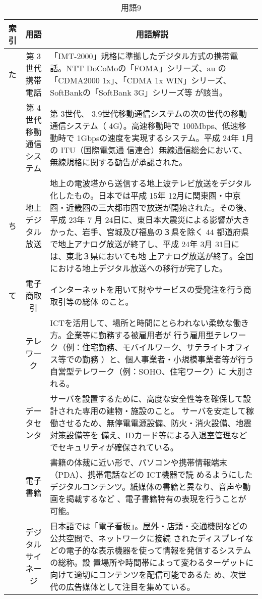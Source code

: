\begin{table}[htb]
  \begin{center}
    \caption{用語9}
    \begin{tabular}{|c|c|p{10cm}|}
      \hline
      索引 & 用語 & \multicolumn{1}{c|}{用語解説} \\
      \hline
      た & 第 3世代携帯電話 & 
      「IMT-2000」規格に準拠したデジタル方式の携帯電話。NTT DoCoMoの「FOMA」シリーズ、au
      の「CDMA2000 1x」、「CDMA 1x WIN」シリーズ、SoftBankの「SoftBank 3G」シリーズ等
      が該当。 \\
      \cline{2-3}
      & 第 4世代移動通信システム & 
      第 3世代、 3.9世代移動通信システムの次の世代の移動通信システム（ 4G）。高速移動時で
      100Mbps、低速移動時で 1Gbpsの速度を実現するシステム。平成 24年 1月の ITU（国際電気通
        信連合）無線通信総会において、無線規格に関する勧告が承認された。 \\
      \hline
      ち & 地上デジタル放送 & 
      地上の電波塔から送信する地上波テレビ放送をデジタル化したもの。日本では平成 15年
      12月に関東圏・中京圏・近畿圏の三大都市圏で放送が開始された。その後、平成 23年 7
      月 24日に、東日本大震災による影響が大きかった、岩手、宮城及び福島の３県を除く 44
      都道府県で地上アナログ放送が終了し、平成 24年 3月 31日には、東北３県においても地
      上アナログ放送が終了。全国における地上デジタル放送への移行が完了した。 \\
      \hline
      て & 電子商取引 & インターネットを用いて財やサービスの受発注を行う商取引等の総体
      のこと。 \\
      \cline{2-3}
      & テレワーク &
      ICTを活用して、場所と時間にとらわれない柔軟な働き方。企業等に勤務する被雇用者が
      行う雇用型テレワーク（例：住宅勤務、モバイルワーク、サテライトオフィス等での勤務
      ）と、個人事業者・小規模事業者等が行う自営型テレワーク（例：SOHO、住宅ワーク）に
      大別される。 \\
      \cline{2-3}
      & データセンタ &
      サーバを設置するために、高度な安全性等を確保して設計された専用の建物・施設のこと。
      サーバを安定して稼働させるため、無停電電源設備、防火・消火設備、地震対策設備等を
      備え、IDカード等による入退室管理などでセキュリティが確保されている。 \\
      \cline{2-3}
      & 電子書籍 & 
      書籍の体裁に近い形で、パソコンや携帯情報端末（PDA）、携帯電話などの ICT機器で読
      めるようにしたデジタルコンテンツ。紙媒体の書籍と異なり、音声や動画を掲載するなど
      、電子書籍特有の表現を行うことが可能。 \\
      \cline{2-3}
      & デジタルサイネージ & 
      日本語では「電子看板」。屋外・店頭・交通機関などの公共空間で、ネットワークに接続
      されたディスプレイなどの電子的な表示機器を使って情報を発信するシステムの総称。設
      置場所や時間帯によって変わるターゲットに向けて適切にコンテンツを配信可能であるた
      め、次世代の広告媒体として注目を集めている。 \\
      \hline
    \end{tabular}
  \end{center}
\end{table}



